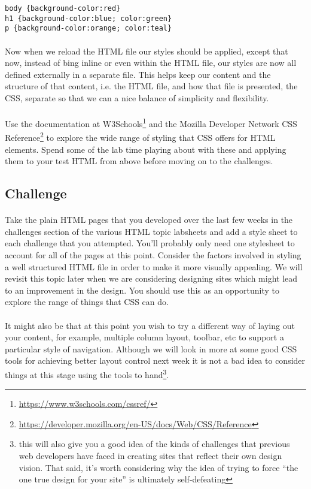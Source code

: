 \documentclass[10pt, a4paper]{article}
\begin{document}
\begin{lstlisting}
body {background-color:red}
h1 {background-color:blue; color:green}
p {background-color:orange; color:teal}
\end{lstlisting}

\paragraph{} Now when we reload the HTML file our styles should be applied, except that now, instead of bing inline or even within the HTML file, our styles are now all defined externally in a separate file. This helps keep our content and the structure of that content, i.e. the HTML file, and how that file is presented, the CSS, separate so that we can a nice balance of simplicity and flexibility.

\paragraph{} Use the documentation at W3Schools\footnote{\url{https://www.w3schools.com/cssref/}} and the Mozilla Developer Network CSS Reference\footnote{\url{https://developer.mozilla.org/en-US/docs/Web/CSS/Reference}} to explore the wide range of styling that CSS offers for HTML elements. Spend some of the lab time playing about with these and applying them to your test HTML from above before moving on to the challenges.

\subsection{Challenge}
\paragraph{} Take the plain HTML pages that you developed over the last few weeks in the challenges section of the various HTML topic labsheets and add a style sheet to each challenge that you attempted. You'll probably only need one stylesheet to account for all of the pages at this point. Consider the factors involved in styling a well structured HTML file in order to make it more visually appealing. We will revisit this topic later when we are considering designing sites which might lead to an improvement in the design. You should use this as an opportunity to explore the range of things that CSS can do.

\paragraph{} It might also be that at this point you wish to try a different way of laying out your content, for example, multiple column layout, toolbar, etc to support a particular style of navigation. Although we will look in more at some good CSS tools for achieving better layout control next week it is not a bad idea to consider things at this stage using the tools to hand\footnote{this will also give you a good idea of the kinds of challenges that previous web developers have faced in creating sites that reflect their own design vision. That said, it's worth considering why the idea of trying to force ``the one true design for your site'' is ultimately self-defeating}.
\end{document}
